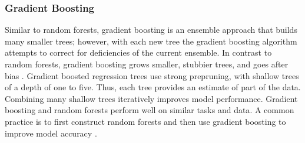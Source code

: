 \documentclass[sigconf]{acmart}
\begin{document}

\subsubsection{Gradient Boosting}

Similar to random forests, gradient boosting is an ensemble approach that 
builds many smaller trees; however, with each new tree the gradient boosting 
algorithm attempts to correct for deficiencies of the current ensemble. 
In contrast to random forests, gradient boosting grows smaller, stubbier 
trees, and goes after bias \cite{jamesetal13, kuhn13}. Gradient boosted 
regression trees use strong prepruning, with shallow trees of a depth of 
one to five. Thus, each tree provides an estimate of part of the data. 
Combining many shallow trees iteratively improves model performance. 
Gradient boosting and random forests perform well on similar tasks and data. 
A common practice is to first construct random forests and then use gradient 
boosting to improve model accuracy \cite{muller17}. 

\end{document}
